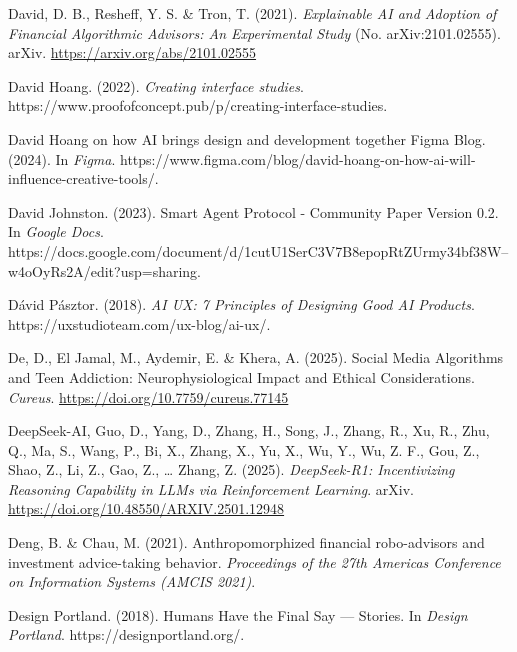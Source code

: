 \documentclass[
  letterpaper,
  DIV=11,
  numbers=noendperiod]{scrartcl}
\newlength{\cslhangindent}
\newenvironment{CSLReferences}[2] %
 {\begin{list}{}{%
  \setlength{\itemindent}{0pt}
  \setlength{\leftmargin}{0pt}
  \setlength{\parsep}{0pt}
  \ifodd #1
   \setlength{\leftmargin}{\cslhangindent}
   \setlength{\itemindent}{-1\cslhangindent}
  \fi
  \setlength{\itemsep}{#2\baselineskip}}}
 {\end{list}}
\begin{document}
\begin{CSLReferences}{1}{0}
David, D. B., Resheff, Y. S. \& Tron, T. (2021). \emph{Explainable {AI}
and {Adoption} of {Financial Algorithmic Advisors}: An {Experimental
Study}} (No. arXiv:2101.02555). arXiv.
\url{https://arxiv.org/abs/2101.02555}

David Hoang. (2022). \emph{Creating interface studies}.
https://www.proofofconcept.pub/p/creating-interface-studies.

David {Hoang} on how {AI} brings design and development together
{\textbar} {Figma Blog}. (2024). In \emph{Figma}.
https://www.figma.com/blog/david-hoang-on-how-ai-will-influence-creative-tools/.

David Johnston. (2023). Smart {Agent Protocol} - {Community Paper
Version} 0.2. In \emph{Google Docs}.
https://docs.google.com/document/d/1cutU1SerC3V7B8epopRtZUrmy34bf38W--w4oOyRs2A/edit?usp=sharing.

Dávid Pásztor. (2018). \emph{{AI UX}: 7 {Principles} of {Designing Good
AI Products}}. https://uxstudioteam.com/ux-blog/ai-ux/.

De, D., El Jamal, M., Aydemir, E. \& Khera, A. (2025). Social {Media
Algorithms} and {Teen Addiction}: {Neurophysiological Impact} and
{Ethical Considerations}. \emph{Cureus}.
\url{https://doi.org/10.7759/cureus.77145}

DeepSeek-AI, Guo, D., Yang, D., Zhang, H., Song, J., Zhang, R., Xu, R.,
Zhu, Q., Ma, S., Wang, P., Bi, X., Zhang, X., Yu, X., Wu, Y., Wu, Z. F.,
Gou, Z., Shao, Z., Li, Z., Gao, Z., \ldots{} Zhang, Z. (2025).
\emph{{DeepSeek-R1}: {Incentivizing Reasoning Capability} in {LLMs} via
{Reinforcement Learning}}. arXiv.
\url{https://doi.org/10.48550/ARXIV.2501.12948}

Deng, B. \& Chau, M. (2021). Anthropomorphized financial robo-advisors
and investment advice-taking behavior. \emph{Proceedings of the 27th
Americas Conference on Information Systems ({AMCIS} 2021)}.

Design Portland. (2018). Humans {Have} the {Final Say} --- {Stories}. In
\emph{Design Portland}. https://designportland.org/.


\end{CSLReferences}
\end{document}
